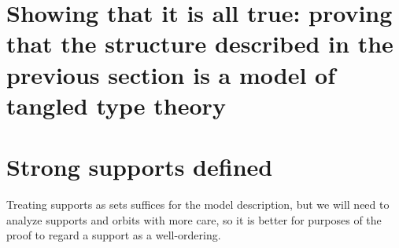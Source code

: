 \newpage

\section{Showing that it is all true:  proving that the structure described in the previous section is a model of tangled type theory}

\section{Strong supports defined}

Treating supports as sets suffices for the model description, but we will need to analyze supports and orbits with more care, so it is better for purposes
of the proof to regard a support as a well-ordering.

